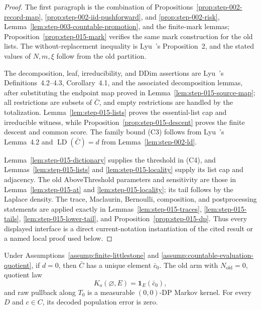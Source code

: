 \begin{proof}
The first paragraph is the combination of Propositions~\ref{prop:step-002-record-map},
\ref{prop:step-002-iid-pushforward}, and \ref{prop:step-002-risk},
Lemma~\ref{lem:step-003-countable-promotion}, and the finite-mark lemmas;
Proposition~\ref{prop:step-015-mark} verifies the same mark construction for
the old lists.  The without-replacement inequality is Lyu~\citep{lyu2025}'s
Proposition~2,
and the stated values of \(N,m,\xi\) follow from the old partition.

The decomposition, leaf, irreducibility, and DDim assertions are Lyu~\citep{lyu2025}'s
Definitions~4.2--4.3, Corollary~4.1, and the associated decomposition lemmas,
after substituting the endpoint map proved in
Lemma~\ref{lem:step-015-source-map}; all restrictions are subsets of \(\bar C\),
and empty restrictions are handled by the totalization.  Lemma~\ref{lem:step-015-lists}
proves the essential-list cap and irreducible witness, while
Proposition~\ref{prop:step-015-descent} proves the finite descent and common
score.  The family bound (C3) follows from Lyu~\citep{lyu2025}'s Lemma~4.2 and
\(\operatorname{LD}(\bar C)=d\) from Lemma~\ref{lem:step-002-ld}.

Lemma~\ref{lem:step-015-dictionary} supplies the threshold in (C4), and
Lemmas~\ref{lem:step-015-lists} and \ref{lem:step-015-locality} supply its
list cap and adjacency.  The old AboveThreshold parameters and sensitivity
are those in Lemma~\ref{lem:step-015-at} and
\ref{lem:step-015-locality}; its tail follows by the Laplace density.
The trace, Maclaurin, Bernoulli, composition, and postprocessing statements
are applied exactly in Lemmas~\ref{lem:step-015-traces},
\ref{lem:step-015-tails}, \ref{lem:step-015-lower-tail}, and
Proposition~\ref{prop:step-015-dp}.  Thus every displayed interface is a
direct current-notation instantiation of the cited result or a named local
proof used below.
\end{proof}





\begin{proposition}\label{prop:step-015-zero}
Under Assumptions~\ref{assump:finite-littlestone} and
\ref{assump:countable-evaluation-quotient}, if \(d=0\), then \(\bar C\)
has a unique element \(\bar c_0\). The old arm with
\(N_{\mathrm{old}}=0\), quotient law
\[
K_{\mathrm o}(\varnothing,E)=\mathbf1_E(\bar c_0),
\tag{1.1}
\]
and raw pullback along \(T_0\) is a measurable \((0,0)\)-DP Markov kernel.
For every \(D\) and \(c\in C\), its decoded population error is zero.


\end{proposition}

